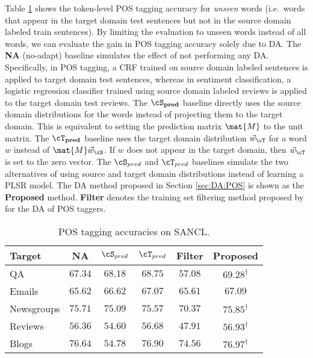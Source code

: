 \documentclass[11pt]{article}
\begin{document}
Table \ref{tbl:POS} shows the token-level POS tagging accuracy for \textit{unseen} words (i.e.\ words that appear in the target
domain test sentences but not in the source domain labeled train sentences). By limiting the evaluation to unseen words
instead of all words, we can evaluate the gain in POS tagging accuracy solely due to DA.
The \textbf{NA} (no-adapt) baseline simulates the effect of not performing any
DA. Specifically, in POS tagging, a CRF trained on source domain labeled sentences is applied
to target domain test sentences, whereas in sentiment classification, a logistic regression classifier
trained using source domain labeled reviews is applied to the target domain test reviews.
The $\mathbf{\cS_{pred}}$ baseline directly uses the source domain
distributions for the words instead of projecting them to the target domain. This is equivalent to setting
the prediction matrix $\mat{M}$ to the unit matrix. The $\mathbf{\cT_{pred}}$ baseline uses the
target domain distribution $\vec{w}_{\cT}$ for a word $w$ instead of $\mat{M}\vec{w}_{\cS}$.
If $w$ does not appear in the target domain, then $\vec{w}_{\cT}$ is set to the zero vector.
The $\cS_{pred}$ and $\cT_{pred}$ baselines simulate the two alternatives of using source
and target domain distributions instead of learning a PLSR model.
The DA method proposed in Section \ref{sec:DA:POS} is shown as the \textbf{Proposed} method. 
\textbf{Filter} denotes the training set filtering method proposed by 
for the DA of POS taggers.


\begin{table}
\small
\begin{center}
\begin{tabular}{|l||c|c|c|c|c|}\hline
Target		&	NA			&	$\cS_{pred}$	& 	$\cT_{pred}$	& Filter		&	 Proposed		 		\\ \hline \hline
QA			&	$67.34$		&	$68.18$		&	$68.75$		& $57.08$	&	$\mathbf{69.28}^{\dagger}$\\				
Emails		&	$65.62$		&	$66.62$		&	$67.07$		& $65.61$	&	$\mathbf{67.09}$			 \\
Newsgroups	&	$75.71$		&	$75.09$		&	$75.57$		& $70.37$	&	$\mathbf{75.85}^{\dagger}$ \\	
Reviews		&	$56.36$		&	$54.60$		&	$56.68$		& $47.91$	&	$\mathbf{56.93}^{\dagger}$ \\	
Blogs		&	$76.64$		&	$54.78$		&	$76.90$		& $74.56$	&	$\mathbf{76.97}^{\dagger}$ \\ \hline
\end{tabular}
\end{center}
\caption{POS tagging accuracies on SANCL.}
\label{tbl:POS}
\end{table}
\end{document}
